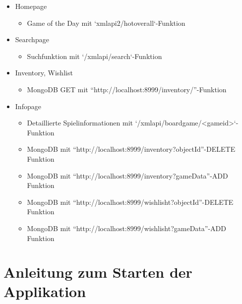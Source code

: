 \begin{itemize}
    \setlength{\itemsep}{-1pt}
    \setlength{\parskip}{-1pt}
    \item Homepage
        \begin{itemize}
        \item Game of the Day mit `xmlapi2/hotoverall`-Funktion
        \end{itemize}
    \item Searchpage
        \begin{itemize}
        \item Suchfunktion mit `/xmlapi/search`-Funktion
        \end{itemize}
    \item Inventory, Wishlist
        \begin{itemize}
        \item MongoDB GET mit ``http://localhost:8999/inventory/''-Funktion 
        \end{itemize}
    \item Infopage
    \begin{itemize}
    \item Detaillierte Spielinformationen mit `/xmlapi/boardgame/<gameid>`-Funktion 
    \item MongoDB mit ``http://localhost:8999/inventory?objectId''-DELETE Funktion
    \item MongoDB mit ``http://localhost:8999/inventory?gameData''-ADD Funktion
    \item MongoDB mit ``http://localhost:8999/wishlisht?objectId''-DELETE Funktion
    \item MongoDB mit ``http://localhost:8999/wishlisht?gameData''-ADD Funktion
    \end{itemize}

\end{itemize}

\section{Anleitung zum Starten der Applikation}
